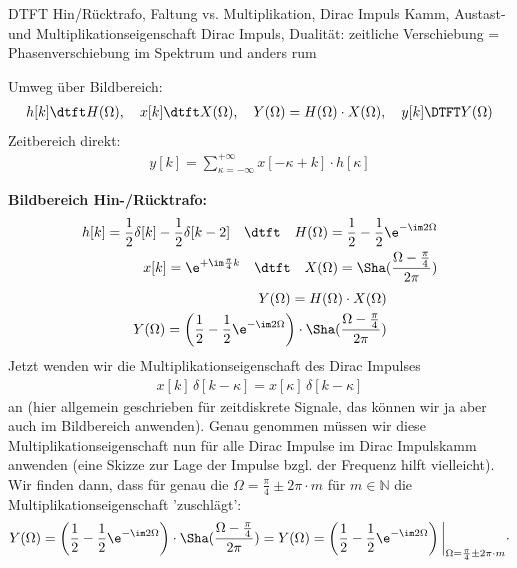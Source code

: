 \begin{Werkzeug}
DTFT Hin/Rücktrafo, Faltung vs. Multiplikation, Dirac Impuls Kamm,
Austast- und Multiplikationseigenschaft Dirac Impuls, Dualität:
zeitliche Verschiebung = Phasenverschiebung im Spektrum und anders rum
\end{Werkzeug}
\begin{Ansatz}
Umweg über Bildbereich:
\begin{align}
h[k]\dtft H(\Omega),\quad x[k]\dtft X(\Omega),\quad
Y(\Omega) = H(\Omega) \cdot X(\Omega),\quad
y[k] \DTFT Y(\Omega)
\end{align}
Zeitbereich direkt:
\begin{align}
y[k] = \sum_{\kappa=-\infty}^{+\infty} x[-\kappa + k] \cdot h[\kappa]
\end{align}
\end{Ansatz}
\begin{ExCalc}
\textbf{Bildbereich Hin-/Rücktrafo:}
\begin{align}
h[k] = \frac{1}{2}\delta[k] - \frac{1}{2}\delta[k-2]\quad\dtft\quad
H(\Omega) = \frac{1}{2} - \frac{1}{2} \e^{-\im 2 \Omega}\\
x[k]=\e^{+\im \frac{\pi}{4} k} \quad\dtft\quad
X(\Omega) = \Sha(\frac{\Omega-\frac{\pi}{4}}{2\pi})
\end{align}
%
\begin{align}
Y(\Omega) = H(\Omega) \cdot X(\Omega)\\
Y(\Omega) = \left(\frac{1}{2} - \frac{1}{2} \e^{-\im 2 \Omega}\right)
\cdot
\Sha(\frac{\Omega-\frac{\pi}{4}}{2\pi})
\end{align}
%
Jetzt wenden wir die Multiplikationseigenschaft des Dirac Impulses
\begin{align}
x[k] \, \delta[k-\kappa] = x[\kappa] \, \delta[k-\kappa]
\end{align}
an (hier allgemein geschrieben für zeitdiskrete Signale, das können wir ja aber auch im
Bildbereich anwenden).
%
Genau genommen müssen wir diese Multiplikationseigenschaft nun für alle Dirac Impulse
im Dirac Impulskamm anwenden (eine Skizze zur Lage der Impulse bzgl. der Frequenz
hilft vielleicht).
%
Wir finden dann, dass für genau die $\Omega=\frac{\pi}{4}\pm 2\pi \cdot m$ für $m\in\mathbb{N}$
die Multiplikationseigenschaft 'zuschlägt':
\begin{align}
Y(\Omega) = \left(\frac{1}{2} - \frac{1}{2} \e^{-\im 2 \Omega}\right)
\cdot
\Sha(\frac{\Omega-\frac{\pi}{4}}{2\pi})
=
Y(\Omega) = \left(\frac{1}{2} - \frac{1}{2} \e^{-\im 2 \Omega}\right)\bigg|_{\Omega=\frac{\pi}{4}\pm 2\pi \cdot m}
\cdot

\end{align}
\end{ExCalc}
